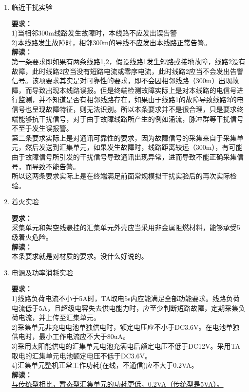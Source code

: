 \documentclass{article}
\begin{document}
\begin{CJK}{UTF8}{gbsn}
\begin{enumerate}
\item 临近干扰实验	
	\par
	\textbf{要求：}\\
	1)当相邻300m线路发生故障时，本线路不应发出误告警\\
	2)本线路发生故障时，相邻300m的导线不应发出本线路正常告警。\\
	\textbf{解读：}\\
	第一条要求即如果有两条线路1,2，假设线路1发生短路或接地故障，线路2没有故障，此时线路2应当没有短路电流或零序电流，此时线路2应当不会发出告警信号。该项要求其实是对可靠性的要求，即不会因相邻线路（300m）出现故障，而导致出现本线路误报。但是终端检测故障实际上是对本线路的电信号进行监测，并不知道是否有相邻线路存在，如果由于线路1的故障导致线路2的电信号也呈现故障特征，则无法识别。所以本条要求并不是很合理，只是要求终端能够抗干扰信号，对于由于故障线路所产生的例如涌流，脉冲群等干扰信号不至于发生误报警。\\
	第二条要求实际上是对通讯可靠性的要求，因为故障信号的采集来自于采集单元，然后发送到汇集单元，如果发生故障时，线路距离较远（300m），有可能由于故障信号所引发的干扰信号导致通讯出现异常，进而导致不能正确采集信号，而导致不能告警。
\\
所以这两条要求实际上是在终端满足前面常规模拟干扰实验后的再次实际检验。
\item 着火实验
	\par
	\textbf{要求：}\\
	采集单元和架空线悬挂的汇集单元外壳应当采用非金属阻燃材料，能够承受5级着火危险。\\
	\textbf{解读：}\\
	本条要求就是对材质的要求。没什么好说的。
\item 电源及功率消耗实验
	\par
	\textbf{要求：}\\
	1)线路负荷电流不小于5A时，TA取电5s内应能满足全部功能要求。线路负荷电流低于5A，且超级电容失去供电能力时，应至少判断短路故障，定期采集负荷电流，并上传至汇集单元。\\
	2)采集单元非充电电池单独供电时，额定电压应不小于DC3.6V。在电池单独供电时，最小工作电流应不大于80uA。\\
	3)采用太阳能供电的汇集单元电池充满电后额定电压不低于DC12V。采用TA取电的汇集单元电池额定电压不低于DC3.6V。\\
	4)汇集单元整机正常工作功耗(在线，不通信)应不大于0.2VA。\\
	\textbf{解读：}\\
	\underline{与传统型相比，暂态型汇集单元的功耗更低，0.2VA（传统型是5VA）。}\\

\end{enumerate}
\end{CJK}
\end{document}
